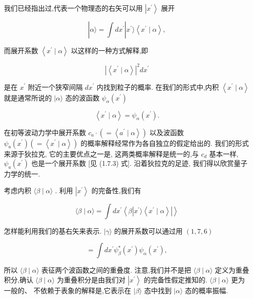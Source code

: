 \documentclass[lang=cn,newtx,10pt,scheme=chinese,thmcnt=section]{elegantbook}
\begin{document}
我们已经指出过,代表一个物理态的右矢可以用 $\left| {x}^{\prime }\right\rangle$ 展开

$$
\left| {\alpha \rangle = \int d{x}^{\prime }}\right| {x}^{\prime }\rangle \left\langle {{x}^{\prime } \mid \alpha }\right\rangle , \tag{1. 7.3}
$$

而展开系数 $\left\langle {{x}^{\prime } \mid \alpha }\right\rangle$ 以这样的一种方式解释,即

$$
{\left| \left\langle {x}^{\prime } \mid \alpha \right\rangle \right| }^{2}d{x}^{\prime } \tag{1.7.4}
$$

是在 ${x}^{\prime }$ 附近一个狭窄间隔 $d{x}^{\prime }$ 内找到粒子的概率. 在我们的形式中,内积 $\left\langle {{x}^{\prime } \mid \alpha }\right\rangle$ 就是通常所说的 $|\alpha \rangle$ 态的波函数 ${\psi }_{\alpha }\left( {x}^{\prime }\right)$

$$
\left\langle {{x}^{\prime } \mid \alpha }\right\rangle = {\psi }_{\alpha }\left( {x}^{\prime }\right) . \tag{1. 7.5}
$$

在初等波动力学中展开系数 ${c}_{a} \cdot \left( { = \left\langle {{a}^{\prime } \mid \alpha }\right\rangle }\right)$ 以及波函数 ${\psi }_{a}\left( {x}^{\prime }\right) \left( { = \left\langle {{x}^{\prime } \mid \alpha }\right\rangle }\right)$ 的概率解释经常作为各自独立的假定给出的. 我们的形式来源于狄拉克, 它的主要优点之一是, 这两类概率解释是统一的,与 ${c}_{d}$ 基本一样, ${\psi }_{a}\left( {x}^{\prime }\right)$ 也是一个展开系数 [见 (1.7.3) 式]. 沿着狄拉克的足迹, 我们得以欣赏量子力学的统一.

考虑内积 $\langle \beta \mid \alpha \rangle$ . 利用 $\left| {x}^{\prime }\right\rangle$ 的完备性,我们有

$$
\langle \beta \mid \alpha \rangle = \int d{x}^{\prime }\left\langle {\beta \left| {{x}^{\prime }\rangle \left\langle {{x}^{\prime } \mid \alpha }\right\rangle }\right| }\right\rangle
$$

怎样能利用我们的基右矢来表示. $|\gamma \rangle$ 的展开系数可以通过用 $\left( {1,7,6}\right)$

$$
= \int d{x}^{\prime }{\psi }_{\beta }^{ * }\left( {x}^{\prime }\right) {\psi }_{\alpha }\left( {x}^{\prime }\right) ,
$$

所以 $\langle \beta \mid \alpha \rangle$ 表征两个波函数之间的重叠度. 注意,我们并不是把 $\langle \beta \mid \alpha \rangle$ 定义为重叠积分,确认 $\langle \beta \mid \alpha \rangle$ 为重叠积分是由我们对 $\left| {x}^{\prime }\right\rangle$ 的完备性假定推知的. $\langle \beta \mid \alpha \rangle$ 更为一般的、 不依赖于表象的解释是,它表示在 $|\beta \rangle$ 态中找到 $|\alpha \rangle$ 态的概率振幅.
\end{document}
